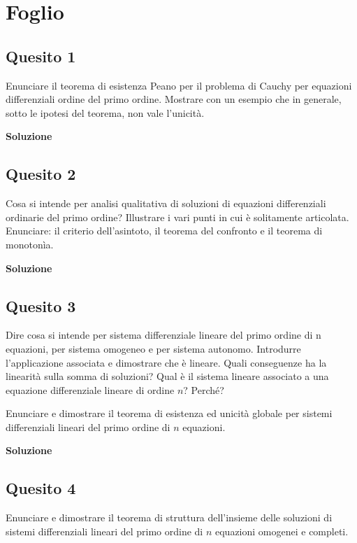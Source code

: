 \chapter{Foglio \ \thechapter}


\section*{Quesito 1}
Enunciare il teorema di esistenza Peano per il problema di Cauchy per equazioni
differenziali ordine del primo ordine. Mostrare con un esempio che in generale, sotto le
ipotesi del teorema, non vale l’unicità.

\medskip
\begin{large}
\textbf{Soluzione}
\end{large}


\section*{Quesito 2}
Cosa si intende per analisi qualitativa di soluzioni di equazioni differenziali ordinarie del primo ordine? Illustrare i vari punti in cui è solitamente articolata. Enunciare:
il criterio dell’asintoto, il teorema del confronto e il teorema di monotonìa.


\medskip
\begin{large}
\textbf{Soluzione}
\end{large}


\section*{Quesito 3}
Dire cosa si intende per sistema differenziale lineare del primo ordine di n
equazioni, per sistema omogeneo e per sistema autonomo. Introdurre l’applicazione associata e dimostrare che è lineare. Quali conseguenze ha la linearità sulla somma di
soluzioni? Qual è il sistema lineare associato a una equazione differenziale lineare di
ordine $n$? Perché?


Enunciare e dimostrare il teorema di esistenza ed unicità globale per sistemi differenziali lineari del primo ordine di $n$ equazioni.


\medskip
\begin{large}
\textbf{Soluzione}
\end{large}


\section*{Quesito 4}
Enunciare e dimostrare il teorema di struttura dell’insieme delle soluzioni di
sistemi differenziali lineari del primo ordine di $n$ equazioni omogenei e completi.

